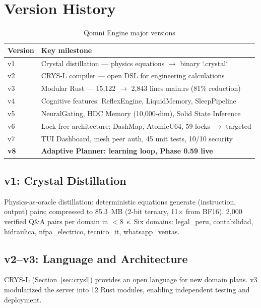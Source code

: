 \documentclass[12pt,a4paper]{article}
\begin{document}
\section{Version History}
\label{sec:history}

\begin{table}[h]
\centering
\caption{Qomni Engine major versions}
\begin{tabular}{ll}
\toprule
Version & Key milestone \\
\midrule
v1 & Crystal distillation --- physics equations $\to$ binary `.crystal` \\
v2 & CRYS-L compiler --- open DSL for engineering calculations \\
v3 & Modular Rust --- 15,122 $\to$ 2,843 lines main.rs (81\% reduction) \\
v4 & Cognitive features: ReflexEngine, LiquidMemory, SleepPipeline \\
v5 & NeuralGating, HDC Memory (10,000-dim), Solid State Inference \\
v6 & Lock-free architecture: DashMap, AtomicU64, 59 locks $\to$ targeted \\
v7 & TUI Dashboard, mesh peer auth, 45 unit tests, 10/10 security \\
\textbf{v8} & \textbf{Adaptive Planner: learning loop, Phase 0.59 live} \\
\bottomrule
\end{tabular}
\end{table}

\subsection{v1: Crystal Distillation}

Physics-as-oracle distillation: deterministic equations generate (instruction,
output) pairs; compressed to 85.3~MB (2-bit ternary, 11$\times$ from BF16).
2,000 verified Q\&A pairs per domain in $<8$~s. Six domains: legal\_peru,
contabilidad, hidraulica, nfpa\_electrico, tecnico\_it, whatsapp\_ventas.

\subsection{v2--v3: Language and Architecture}

CRYS-L (Section~\ref{sec:crysl}) provides an open language for new domain plans.
v3 modularized the server into 12 Rust modules, enabling independent testing and deployment.
\end{document}
